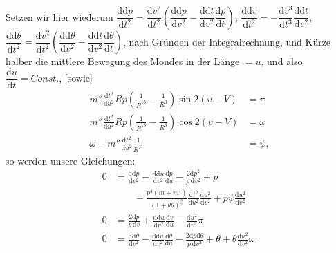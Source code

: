 \par\noindent Setzen wir hier wiederum
\(\dfrac{\mathrm{dd}p}{\mathrm{d}t^2}
 =\dfrac{\mathrm{d}v^2}{\mathrm{d}t^2}
 \left(\dfrac{\mathrm{dd}p}{\mathrm{d}v^2}
 -\dfrac{\mathrm{dd}t}{\mathrm{d}v^2}\dfrac{\mathrm{d}p}{\mathrm{d}t}\right)\),
\(\dfrac{\mathrm{dd}v}{\mathrm{d}t^2}
 =-\dfrac{\mathrm{d}v^3}{\mathrm{d}t^3}
 \dfrac{\mathrm{dd}t}{\mathrm{d}v^2}\),
\(\dfrac{\mathrm{dd}\theta}{\mathrm{d}t^2}
 =\dfrac{\mathrm{d}v^2}{\mathrm{d}t^2}
 \left(\dfrac{\mathrm{dd}\theta}{\mathrm{d}v^2}
 -\dfrac{\mathrm{dd}t}{\mathrm{d}v^2}\dfrac{\mathrm{d}\theta}{\mathrm{d}t}\right)\),
nach Gründen der Integralrechnung, und Kürze halber die mittlere Bewegung
des Mondes in der Länge \(=u\), und also
\(\dfrac{\mathrm{d}u}{\mathrm{d}t}=\mathit{Const.}\), [sowie]
\[
\begin{aligned}
m''\frac{\mathrm{d}t^2}{\mathrm{d}u^2}Rp
 \left(\frac{1}{R'^3}-\frac{1}{R^3}\right)\sin 2(v-V)&=\pi\\[5pt]
m''\frac{\mathrm{d}t^2}{\mathrm{d}u^2}Rp
 \left(\frac{1}{R'^3}-\frac{1}{R^3}\right)\cos 2(v-V)&=\omega\\[5pt]
\omega-m''\frac{\mathrm{d}t^2}{\mathrm{d}u^2}\frac{1}{R'^3}&=\psi,
\end{aligned}
\]
\noindent so werden unsere Gleichungen:
\[
\begin{aligned}
0&=\frac{\mathrm{dd}p}{\mathrm{d}v^2}
  -\frac{\mathrm{dd}u}{\mathrm{d}v^2}\frac{\mathrm{d}p}{\mathrm{d}u}
  -\frac{2\mathrm{d}p^2}{p\,\mathrm{d}v^2}+p\\
 &\qquad-\frac{p^4(m+m')}{(1+\theta\theta)^{\frac{3}{2}}}
  \frac{\mathrm{d}t^2}{\mathrm{d}u^2}\frac{\mathrm{d}u^2}{\mathrm{d}v^2}
  +p\psi\frac{\mathrm{d}u^2}{\mathrm{d}v^2}\\[5pt]
0&=\frac{2\mathrm{d}p}{p\,\mathrm{d}v}
  +\frac{\mathrm{dd}u}{\mathrm{d}v^2}\frac{\mathrm{d}v}{\mathrm{d}u}
  -\frac{\mathrm{d}u^2}{\mathrm{d}v^2}\pi\\[5pt]
0&=\frac{\mathrm{dd}\theta}{\mathrm{d}v^2}
  -\frac{\mathrm{dd}u}{\mathrm{d}v^2}\frac{\mathrm{d}\theta}{\mathrm{d}u}
  -\frac{2\mathrm{d}p\mathrm{d}\theta}{p\,\mathrm{d}v^2}
  +\theta+\theta\frac{\mathrm{d}u^2}{\mathrm{d}v^2}\omega.
\end{aligned}
\]

